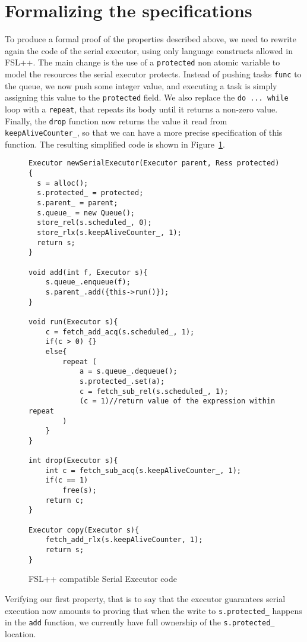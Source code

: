 \section{Formalizing the specifications}

To produce a formal proof of the properties described above, we need to rewrite again the code of the serial executor, using only language constructs allowed in FSL++. The main change is the use of a \texttt{protected} non atomic variable to model the resources the serial executor protects. Instead of pushing tasks \texttt{func} to the queue, we now push some integer value, and executing a task is simply assigning this value to the \texttt{protected} field. We also replace the \texttt{do ... while} loop with a \texttt{repeat}, that repeats its body until it returns a non-zero value. Finally, the \texttt{drop} function now returns the value it read from \texttt{keepAliveCounter\_}, so that we can have a more precise specification of this function. The resulting simplified code is shown in Figure~\ref{fig:serialExecCP}.

\begin{figure}
	\begin{lstlisting}
Executor newSerialExecutor(Executor parent, Ress protected){
  s = alloc();
  s.protected_ = protected;
  s.parent_ = parent;
  s.queue_ = new Queue();
  store_rel(s.scheduled_, 0);
  store_rlx(s.keepAliveCounter_, 1);
  return s;
}

void add(int f, Executor s){
	s.queue_.enqueue(f);
	s.parent_.add({this->run()});
}

void run(Executor s){
	c = fetch_add_acq(s.scheduled_, 1);
	if(c > 0) {}
	else{
		repeat (
			a = s.queue_.dequeue();
			s.protected_.set(a);
			c = fetch_sub_rel(s.scheduled_, 1);
			(c = 1)//return value of the expression within repeat
		)
	}
}

int drop(Executor s){
	int c = fetch_sub_acq(s.keepAliveCounter_, 1);
	if(c == 1)
		free(s);
	return c;
}

Executor copy(Executor s){
	fetch_add_rlx(s.keepAliveCounter, 1);
	return s;
}
	\end{lstlisting}


	\caption{FSL++ compatible Serial Executor code}
	\label{fig:serialExecCP}
\end{figure}

Verifying our first property, that is to say that the executor guarantees serial execution now amounts to proving that when the write to \texttt{s.protected\_} happens in the \texttt{add} function, we currently have full ownership of the \texttt{s.protected\_} location.

